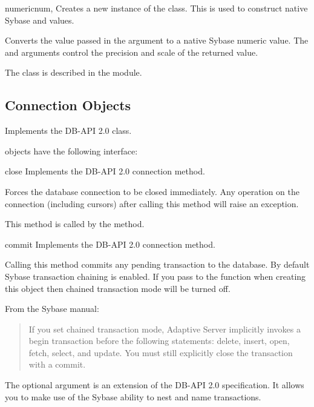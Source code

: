 \begin{funcdesc}{numeric}{num, }
Creates a new instance of the  class.  This is used to
construct native Sybase  and  values.

Converts the value passed in the  argument to a native Sybase
numeric value.  The  and  arguments control
the precision and scale of the returned value.

The  class is described in the 
module.
\end{funcdesc}

\subsection{Connection Objects}

Implements the DB-API 2.0  class.

 objects have the following interface:

\begin{methoddesc}[Connection]{close}{}
Implements the DB-API 2.0 connection  method.

Forces the database connection to be closed immediately.  Any
operation on the connection (including cursors) after calling this
method will raise an exception.

This method is called by the  method.
\end{methoddesc}

\begin{methoddesc}[Connection]{commit}{}
Implements the DB-API 2.0 connection  method.

Calling this method commits any pending transaction to the database.
By default Sybase transaction chaining is enabled.  If you pass
 to the  function when
creating this  object then chained transaction mode
will be turned off.

From the Sybase manual:
\begin{quote}
If you set chained transaction mode, Adaptive Server implicitly
invokes a begin transaction before the following statements: delete,
insert, open, fetch, select, and update. You must still explicitly
close the transaction with a commit.
\end{quote}

The optional  argument is an extension of the DB-API 2.0
specification.  It allows you to make use of the Sybase ability to
nest and name transactions.
\end{methoddesc}

